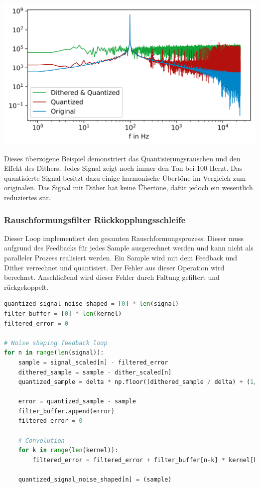 \includegraphics{./img/41398359f293db667c0a2100ef0e24205531cfb0.png}

Dieses überzogene Beispiel demonstriert das Quantisierungsrauschen und
den Effekt des Dithers. Jedes Signal zeigt noch immer den Ton bei 100
Herzt. Das quantisierte Signal besitzt dazu einige harmonische Übertöne
im Vergleich zum originalen. Das Signal mit Dither hat keine Übertöne,
dafür jedoch ein wesentlich reduziertes \gls{snr}.

\hypertarget{rauschformungsfilter-ruxfcckkopplungsschleife}{%
\subsubsection{Rauschformungsfilter
Rückkopplungsschleife}\label{rauschformungsfilter-ruxfcckkopplungsschleife}}

Dieser Loop implementiert den gesamten Rauschformungsprozess. Dieser
muss aufgrund des Feedbacks für jedes Sample ausgerechnet werden und
kann nicht als paralleler Prozess realisiert werden. Ein Sample wird mit
dem Feedback und Dither verrechnet und quantisiert. Der Fehler aus
dieser Operation wird berechnet. Anschließend wird dieser Fehler durch
Faltung gefiltert und rückgekoppelt.

\begin{lstlisting}[language=Python]
quantized_signal_noise_shaped = [0] * len(signal)
filter_buffer = [0] * len(kernel)
filtered_error = 0

# Noise shaping feedback loop
for n in range(len(signal)):
    sample = signal_scaled[n] - filtered_error
    dithered_sample = sample - dither_scaled[n]
    quantized_sample = delta * np.floor((dithered_sample / delta) + (1/2))

    error = quantized_sample - sample
    filter_buffer.append(error)
    filtered_error = 0

    # Convolution
    for k in range(len(kernel)):
        filtered_error = filtered_error + filter_buffer[n-k] * kernel[k]

    quantized_signal_noise_shaped[n] = (sample)
\end{lstlisting}

